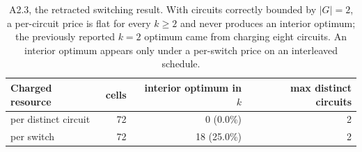 \begin{table}[h]\centering\small
\begin{tabular}{lrrr}
\toprule
Charged resource & cells & interior optimum in $k$ & max distinct circuits \\
\midrule
per distinct circuit & 72 & 0 (0.0\%) & 2 \\
per switch & 72 & 18 (25.0\%) & 2 \\
\bottomrule\end{tabular}
\caption{A2.3, the retracted switching result. With circuits correctly bounded by $|G|=2$, a per-circuit price is flat for every $k\ge2$ and never produces an interior optimum; the previously reported $k=2$ optimum came from charging eight circuits. An interior optimum appears only under a per-switch price on an interleaved schedule.}
\label{tab:switch}
\end{table}

